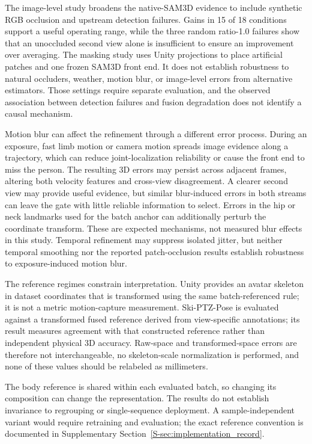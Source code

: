 \documentclass[preprint,12pt]{elsarticle}
\begin{document}
The image-level study broadens the native-SAM3D evidence to include synthetic RGB occlusion and upstream detection failures. Gains in 15 of 18 conditions support a useful operating range, while the three random ratio-1.0 failures show that an unoccluded second view alone is insufficient to ensure an improvement over averaging. The masking study uses Unity projections to place artificial patches and one frozen SAM3D front end. It does not establish robustness to natural occluders, weather, motion blur, or image-level errors from alternative estimators. Those settings require separate evaluation, and the observed association between detection failures and fusion degradation does not identify a causal mechanism.

Motion blur can affect the refinement through a different error process. During an exposure, fast limb motion or camera motion spreads image evidence along a trajectory, which can reduce joint-localization reliability or cause the front end to miss the person. The resulting 3D errors may persist across adjacent frames, altering both velocity features and cross-view disagreement. A clearer second view may provide useful evidence, but similar blur-induced errors in both streams can leave the gate with little reliable information to select. Errors in the hip or neck landmarks used for the batch anchor can additionally perturb the coordinate transform. These are expected mechanisms, not measured blur effects in this study. Temporal refinement may suppress isolated jitter, but neither temporal smoothing nor the reported patch-occlusion results establish robustness to exposure-induced motion blur.

The reference regimes constrain interpretation. Unity provides an avatar skeleton in dataset coordinates that is transformed using the same batch-referenced rule; it is not a metric motion-capture measurement. Ski-PTZ-Pose is evaluated against a transformed fused reference derived from view-specific annotations; its result measures agreement with that constructed reference rather than independent physical 3D accuracy. Raw-space and transformed-space errors are therefore not interchangeable, no skeleton-scale normalization is performed, and none of these values should be relabeled as millimeters.

The body reference is shared within each evaluated batch, so changing its composition can change the representation. The results do not establish invariance to regrouping or single-sequence deployment. A sample-independent variant would require retraining and evaluation; the exact reference convention is documented in Supplementary Section~\ref{S-sec:implementation_record}.
\end{document}
